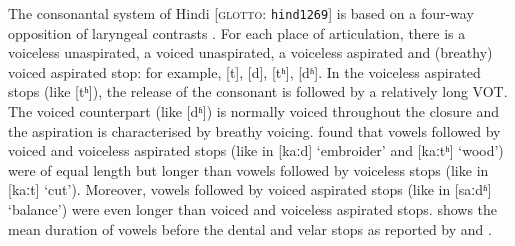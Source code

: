 \documentclass[11pt,a4paper,oneside,openany]{memoir}\usepackage[]{graphicx}\usepackage[]{color}
\begin{document}
The consonantal system of Hindi [\textsc{glotto}: \texttt{hind1269}] is based on a four-way opposition of laryngeal contrasts \citep{ohala1983}.
For each place of articulation, there is a voiceless unaspirated, a voiced unaspirated, a voiceless aspirated and (breathy) voiced aspirated stop: for example, [t], [d], [tʰ], [dʱ].
In the voiceless aspirated stops (like [tʰ]), the release of the consonant is followed by a relatively long VOT.
The voiced counterpart (like [dʱ]) is normally voiced throughout the closure and the aspiration is characterised by breathy voicing.
\citet{maddieson1976} found that vowels followed by voiced and voiceless aspirated stops (like in [kaːd] `embroider' and [kaːtʰ] `wood') were of equal length but longer than vowels followed by voiceless stops (like in [kaːt] `cut').
Moreover, vowels followed by voiced aspirated stops (like in [saːdʱ] `balance') were even longer than voiced and voiceless aspirated stops.
 shows the mean duration of vowels before the dental and velar stops as reported by \citet{maddieson1976} and \citet{lampp2004}.

\end{document}
